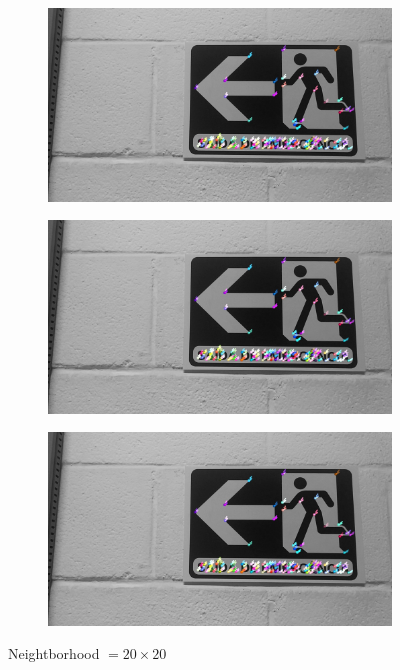 \begin{figure}[!h]
    \hspace{-1cm}
    \centering
	\begin{subfigure}{0.33\textwidth}
	  \centering
	  \includegraphics[width=0.99\linewidth]{figs/flow20x20-1.jpg}
	\end{subfigure}%
	\begin{subfigure}{0.33\textwidth}
	  \centering
	  \includegraphics[width=0.99\linewidth]{figs/flow20x20-1.jpg}
	\end{subfigure}%
	\begin{subfigure}{0.33\textwidth}
        \centering
      \includegraphics[width=0.99\linewidth]{figs/flow20x20-1.jpg}
    \end{subfigure}
    \endminipage\hfill
    
    \caption{Neightborhood $= 20 \times 20$}
    \label{fig:comparison-neigh-pyramid3}
     
\end{figure}


